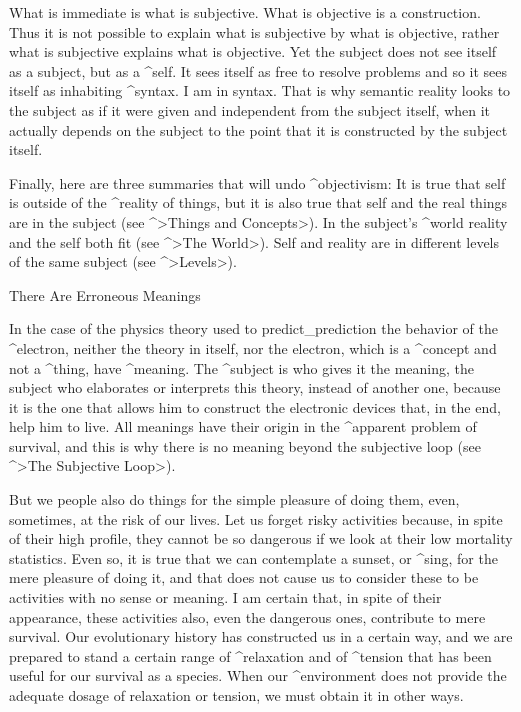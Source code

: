 What is immediate is what is subjective. What is objective is a
construction. Thus it is not possible to explain what is subjective by
what is objective, rather what is subjective explains what is objective.
Yet the subject does not see itself as a subject, but as a ^{self}. It
sees itself as free to resolve problems and so it sees itself as
inhabiting ^{syntax}. I am in syntax. That is why semantic reality looks
to the subject as if it were given and independent from the subject
itself, when it actually depends on the subject to the point that it is
constructed by the subject itself.

Finally, here are three summaries that will undo ^{objectivism}:
\point It is true that self is outside of the ^{reality} of things, but
it is also true that self and the real things are in the subject (see
^>Things and Concepts>).
\point In the subject's ^{world} reality and the self both fit (see
^>The World>).
\point Self and reality are in different levels of the same subject
(see ^>Levels>).


\Section There Are Erroneous Meanings

In the case of the physics theory used to predict_{prediction} the
behavior of the ^{electron}, neither the theory in itself, nor the
electron, which is a ^{concept} and not a ^{thing}, have ^{meaning}. The
^{subject} is who gives it the meaning, the subject who elaborates or
interprets this theory, instead of another one, because it is the one
that allows him to construct the electronic devices that, in the end,
help him to live. All meanings have their origin in the ^{apparent
problem} of survival, and this is why there is no meaning beyond the
subjective loop (see ^>The Subjective Loop>).

But we people also do things for the simple pleasure of doing them,
even, sometimes, at the risk of our lives. Let us forget risky
activities because, in spite of their high profile, they cannot be so
dangerous if we look at their low mortality statistics. Even so, it is
true that we can contemplate a sunset, or ^{sing}, for the mere pleasure
of doing it, and that does not cause us to consider these to be
activities with no sense or meaning. I am certain that, in spite of
their appearance, these activities also, even the dangerous ones,
contribute to mere survival. Our evolutionary history has constructed us
in a certain way, and we are prepared to stand a certain range of
^{relaxation} and of ^{tension} that has been useful for our survival as
a species. When our ^{environment} does not provide the adequate dosage
of relaxation or tension, we must obtain it in other ways.

